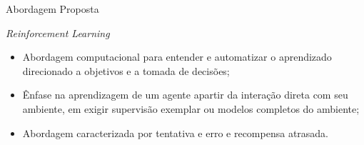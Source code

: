 \documentclass[aspectratio=169]{beamer}
\begin{document}

\begin{frame}{Abordagem Proposta}
	\begin{block}{\textit{Reinforcement Learning}}
		\begin{itemize}
			\item Abordagem computacional para entender e automatizar o aprendizado direcionado a objetivos e a tomada de decisões;
			\item Ênfase na aprendizagem de um agente apartir da interação direta com seu ambiente, em exigir supervisão exemplar ou modelos completos do ambiente;
			\item Abordagem caracterizada por tentativa e erro e recompensa atrasada.
		\end{itemize}
	\end{block}
\end{frame}
\end{document}
